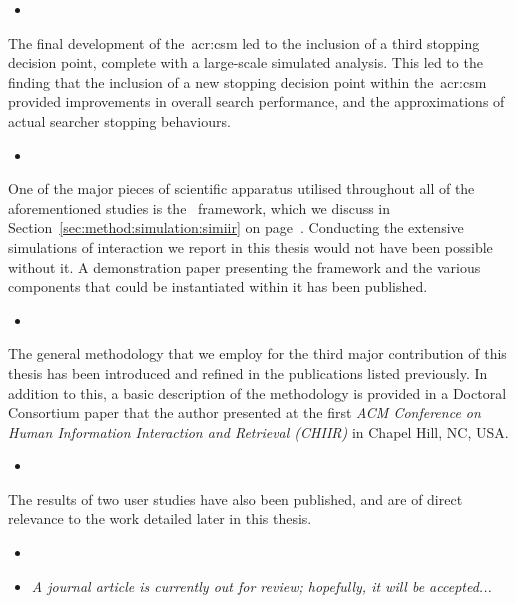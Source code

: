 \begin{itemize}
    \item{}
\end{itemize}

The final development of the~\gls{acr:csm} led to the inclusion of a third stopping decision point, complete with a large-scale simulated analysis. This led to the finding that the inclusion of a new stopping decision point within the~\gls{acr:csm} provided improvements in overall search performance, and the approximations of actual searcher stopping behaviours.

\begin{itemize}
    \item{}
\end{itemize}

\noindent
{}
One of the major pieces of scientific apparatus utilised throughout all of the aforementioned studies is the \simiir~framework, which we discuss in Section~\ref{sec:method:simulation:simiir} on page~\pageref{sec:method:simulation:simiir}. Conducting the extensive simulations of interaction we report in this thesis would not have been possible without it. A demonstration paper presenting the framework and the various components that could be instantiated within it has been published.

\begin{itemize}
    \item{}
\end{itemize}

\noindent
{}
The general methodology that we employ for the third major contribution of this thesis has been introduced and refined in the publications listed previously. In addition to this, a basic description of the methodology is provided in a Doctoral Consortium paper that the author presented at the first \emph{ACM Conference on Human Information Interaction and Retrieval (CHIIR)} in Chapel Hill, NC, USA.

\begin{itemize}
    \item{}
\end{itemize}

The results of two user studies have also been published, and are of direct relevance to the work detailed later in this thesis.

\begin{itemize}
    \item{}
    \item{\emph{A journal article is currently out for review; hopefully, it will be accepted...}}
\end{itemize}


